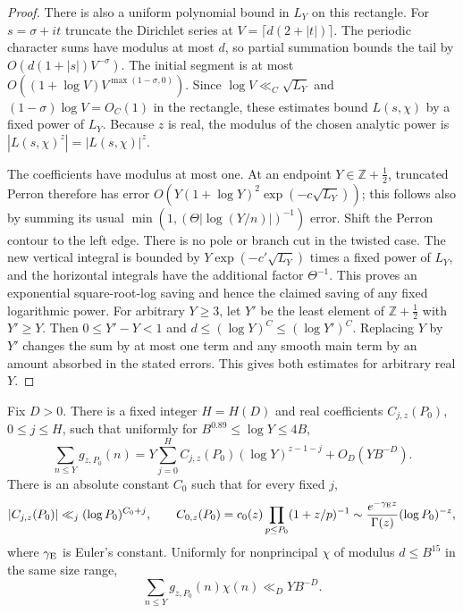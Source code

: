 \begin{proof}
There is also a uniform polynomial bound in $L_Y$ on this rectangle.
For $s=\sigma+it$ truncate the Dirichlet series at
$V=\lceil d(2+|t|)\rceil$.  The periodic character sums have modulus at most
$d$, so partial summation bounds the tail by
$O(d(1+|s|)V^{-\sigma})$.  The initial segment is at most
$O((1+\log V)V^{\max(1-\sigma,0)})$.  Since
$\log V\ll_C\sqrt{L_Y}$ and $(1-\sigma)\log V=O_C(1)$ in the rectangle,
these estimates bound $L(s,\chi)$ by a fixed power of $L_Y$.
Because $z$ is real, the modulus of the chosen analytic power is
$|L(s,\chi)^z|=|L(s,\chi)|^z$.

The coefficients have modulus at most one.  At an endpoint
$Y\in\mathbb Z+\tfrac12$, truncated Perron therefore has error
$O(Y(1+\log Y)^2\exp(-c\sqrt{L_Y}))$; this follows also by summing its usual
$\min(1,(\Theta|\log(Y/n)|)^{-1})$ error.
Shift the Perron contour to the left edge.  There is no pole or branch cut
in the twisted case.  The new vertical integral is bounded by
$Y\exp(-c'\sqrt{L_Y})$ times a fixed power of $L_Y$, and the horizontal
integrals have the additional factor $\Theta^{-1}$.  This proves an exponential
square-root-log saving and hence the claimed saving of any fixed logarithmic
power.  For arbitrary $Y\ge3$, let $Y'$ be the least element of
$\mathbb Z+\tfrac12$ with $Y'\ge Y$.  Then $0\le Y'-Y<1$ and
$d\le(\log Y)^C\le(\log Y')^C$.  Replacing $Y$ by $Y'$ changes the sum by
at most one term and any smooth main term by an amount absorbed in the
stated errors.  This gives both estimates for arbitrary real $Y$.
\end{proof}

\begin{lemma}
\label{lem:arith-rough-sd}
Fix $D>0$.  There is a fixed integer $H=H(D)$ and real coefficients
$C_{j,z}(P_0)$, $0\le j\le H$, such that uniformly for
$B^{0.89}\le\log Y\le4B$,
\[
 \sum_{n\le Y}g_{z,P_0}(n)
 =Y\sum_{j=0}^{H}C_{j,z}(P_0)(\log Y)^{z-1-j}
       +O_D(YB^{-D}).
\]
There is an absolute constant $C_0$ such that for every fixed $j$,
\[
 |C_{j,z}(P_0)|\ll_j(\log P_0)^{C_0+j},\qquad
 C_{0,z}(P_0)=c_0(z)\prod_{p\le P_0}(1+z/p)^{-1}
       \sim\frac{e^{-\gamma_{\rm E}z}}{\Gamma(z)}(\log P_0)^{-z},
\]
where $\gamma_{\rm E}$ is Euler's constant.  Uniformly for nonprincipal
$\chi$ of modulus $d\le B^{15}$ in the same size range,
\[
 \sum_{n\le Y}g_{z,P_0}(n)\chi(n)\ll_D YB^{-D}.
\]
\end{lemma}


